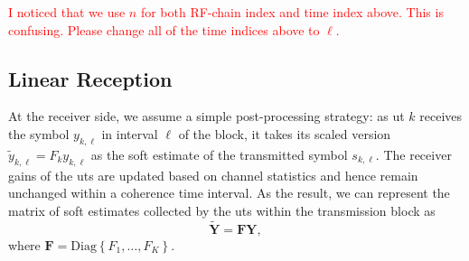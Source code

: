 \documentclass[12pt,draftclsnofoot,onecolumn,journal]{IEEEtran}
\newcommand{\cmt}[1]{\textcolor{red}{#1} }
\newcommand{\Diag}[1]{ \mathrm{Diag}\left\lbrace #1 \right\rbrace }
\begin{document}
\cmt{I noticed that we use $n$ for both RF-chain index and time index above. This is confusing. Please change all of the time indices above to $\ell$.}

\subsection{Linear Reception}
At the receiver side, we assume a simple post-processing strategy: as \ac{ut} $k$ receives the symbol $y_{k,\ell}$ in interval $\ell$ of the block, it takes its scaled version $\tilde{y}_{k,\ell} = F_k y_{k,\ell}$ as the soft estimate of the transmitted symbol $s_{k,\ell}$. The receiver gains of the \acp{ut} are updated based on channel statistics and hence remain unchanged within a coherence time interval. As the result, we can represent the matrix of soft estimates collected by the \acp{ut} within the transmission block as
\begin{equation}
	\tilde{\mathbf Y}=\mathbf F \mathbf Y, %
\end{equation}
where $\mathbf{F} = \Diag{ F_1, \ldots, F_K }$.  %


\end{document}
